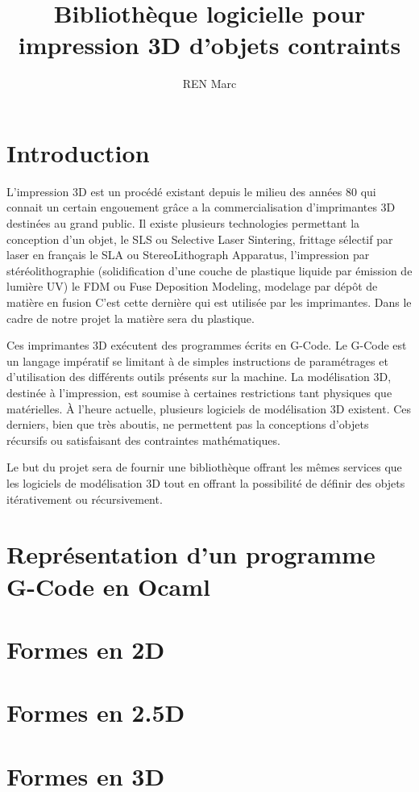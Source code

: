\documentclass[a4paper,11pt]{article}
\title{Bibliothèque logicielle pour impression 3D d’objets contraints}
\author{REN Marc}
\begin{document}
\maketitle
\tableofcontents

\begin{abstract}
\end{abstract}

\section{Introduction}
L'impression 3D est un procédé existant depuis le milieu des années 80 qui connait un certain engouement grâce a la commercialisation d'imprimantes 3D destinées au grand public.
Il existe plusieurs technologies permettant la conception d'un objet,
le SLS ou Selective Laser Sintering, frittage sélectif par laser en français
le SLA ou StereoLithograph Apparatus, l'impression par stéréolithographie (solidification d'une couche de plastique liquide par émission de lumière UV)
le FDM ou Fuse Deposition Modeling, modelage par dépôt de matière en fusion
C'est cette dernière qui est utilisée par les imprimantes. Dans le cadre de notre projet la matière sera du plastique.

Ces imprimantes 3D exécutent des programmes écrits en G-Code. 
Le G-Code est un langage impératif se limitant à de simples instructions de paramétrages et d'utilisation des différents outils présents sur la machine. 
La modélisation 3D, destinée à l’impression, est soumise à certaines restrictions tant physiques que matérielles. À l’heure actuelle, plusieurs logiciels de modélisation 3D existent. Ces derniers, bien que très aboutis, ne permettent pas la conceptions d’objets récursifs ou satisfaisant des contraintes mathématiques.

Le but du projet sera de fournir une bibliothèque offrant les mêmes services que les logiciels de modélisation 3D tout en offrant la possibilité de définir des objets itérativement ou récursivement.
\newpage

\section{Représentation d'un programme G-Code en Ocaml}
\section{Formes en 2D}
\section{Formes en 2.5D}
\section{Formes en 3D}
\end{document}

